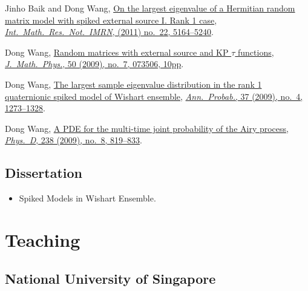 \begin{etaremune}
\item Jinho Baik and  Dong Wang,
  \href{http://arxiv.org/abs/1010.4604}{On the largest eigenvalue of a Hermitian random matrix model with spiked external source I. Rank 1 case}, \href{https://doi.org/10.1093/imrn/rnq257}{\textit{Int.\ Math.\ Res.\ Not.\ IMRN}, (2011) no.\ 22, 5164--5240}.
\item Dong Wang,
  \href{http://arxiv.org/abs/0810.0280}{Random matrices with external source and KP $\tau$ functions}, \href{https://doi.org/10.1063/1.3167802}{\textit{J.\ Math.\ Phys.}, 50 (2009), no.\ 7, 073506, 10pp}.
\item Dong Wang,
 \href{http://arxiv.org/abs/0711.2722}{The largest sample eigenvalue distribution in the rank 1 quaternionic spiked model of Wishart ensemble}, \href{https://doi.org/10.1214/08-AOP432}{\textit{Ann.\ Probab.}, 37 (2009), no.\ 4, 1273--1328}.
\item Dong Wang,
  \href{http://arxiv.org/abs/0711.3797}{A PDE for the multi-time joint probability of the Airy process}, \href{https://doi.org/10.1016/j.physd.2009.02.007}{\textit{Phys.\ D}, 238 (2009), no.\ 8, 819--833}.
\end{etaremune}

\subsection*{Dissertation }
\begin{itemize}
\item
  Spiked Models in Wishart Ensemble.
\end{itemize}

\section*{Teaching }

\subsection*{National University of Singapore }

